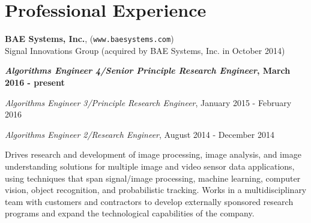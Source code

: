 \section{\sc Professional Experience} %


{\bf BAE Systems, Inc.}, (\texttt{www.baesystems.com})\\
Signal Innovations Group (acquired by BAE Systems, Inc. in October 2014)
\begin{list1}
\item[] \textbf{\textit{Algorithms Engineer 4/Senior Principle Research Engineer}, March 2016 - present}
\item[] {\em Algorithms Engineer 3/Principle Research Engineer}, January 2015 - February 2016
\item[] {\em Algorithms Engineer 2/Research Engineer}, August 2014 - December 2014
\item[] Drives research and development of image processing, image analysis, and image understanding solutions for multiple image and video sensor data applications, using techniques that span signal/image processing, machine learning, computer vision, object recognition, and probabilistic tracking.  Works in a multidisciplinary team with customers and contractors to develop externally sponsored research programs and expand the technological capabilities of the company.
 
\end{list1}


%



